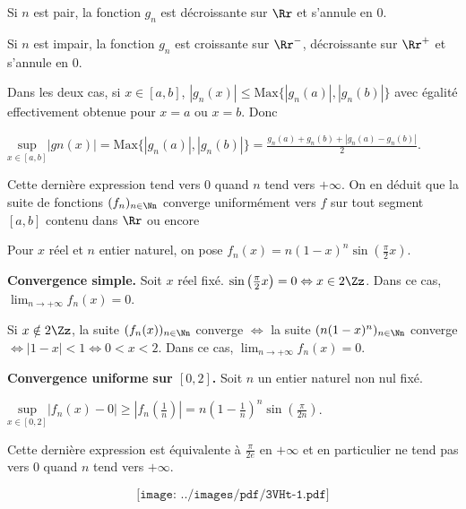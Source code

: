 {{Si $n$ est pair, la fonction $g_n$ est décroissante sur $\Rr$ et s'annule en $0$.

Si $n$ est impair, la fonction $g_n$ est croissante sur $\Rr^-$, décroissante sur $\Rr^+$ et s'annule en $0$.

Dans les deux cas, si $x\in[a,b]$, $|g_n(x)|\leqslant\text{Max}\{|g_n(a)|,|g_n(b)|\}$ avec égalité effectivement obtenue pour $x=a$ ou $x=b$. Donc 

\begin{center}
$\underset{x\in[a,b]}{\text{sup}}|gn(x)|=\text{Max}\{|g_n(a)|,|g_n(b)|\}=\frac{g_n(a)+g_n(b)+|g_n(a)-g_n(b)|}{2}$.
\end{center}

Cette dernière expression tend vers $0$ quand $n$ tend vers $+\infty$. On en déduit que la suite de fonctions $(f_n)_{n\in\Nn}$ converge uniformément vers $f$ sur tout segment $[a,b]$ contenu dans $\Rr$ ou encore 

\begin{center}
\end{center}
Pour $x$ réel et $n$ entier naturel, on pose $f_n(x) =n(1-x)^n\sin\left(\frac{\pi}{2}x\right)$.

\textbf{Convergence simple.} Soit $x$ réel fixé. $\sin\left(\frac{\pi}{2}x\right)=0\Leftrightarrow x\in 2\Zz$. Dans ce cas, $\lim_{n \rightarrow +\infty}f_n(x) =0$.

Si $x\notin 2\Zz$, la suite $(f_n(x))_{n\in\Nn}$ converge $\Leftrightarrow$ la suite $(n(1-x)^n)_{n\in\Nn}$ converge $\Leftrightarrow |1-x| < 1 \Leftrightarrow 0 < x < 2$. Dans ce cas, $\lim_{n \rightarrow +\infty}f_n(x)=0$.

\begin{center}
\end{center}

\textbf{Convergence uniforme sur $[0,2]$.} Soit  $n$ un entier naturel non nul fixé.

\begin{center}
$\underset{x\in[0,2]}{\text{sup}}|f_n(x)-0|\geqslant\left|f_n\left(\frac{1}{n}\right)\right|=n\left(1-\frac{1}{n}\right)^n\sin\left(\frac{\pi}{2n}\right)$.
\end{center}

Cette dernière expression est équivalente à $\frac{\pi}{2e}$ en $+\infty$ et en particulier ne tend pas vers $0$ quand $n$ tend vers $+\infty$. 

\begin{center}
\end{center}

$$\texttt{[image: ../images/pdf/3VHt-1.pdf]}$$


\begin{center}
\end{center}
}
}
